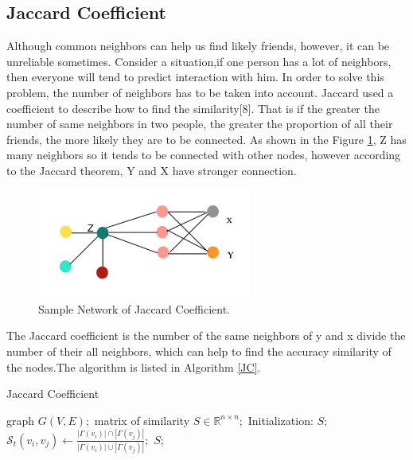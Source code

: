 \documentclass{article}
\begin{document}
\subsection{Jaccard Coefficient}
Although common neighbors can help us find likely friends, however, it can be unreliable sometimes. Consider a situation,if one person has a lot of neighbors, then everyone will tend to predict interaction with him. In order to solve this problem, the number of neighbors has to be taken into account. Jaccard used a coefficient to describe how to find the similarity[8]. That is if the greater the number of same neighbors in two people, the greater the proportion of all their friends, the more likely they are to be connected. As shown in the Figure \ref{JC_NW}, Z has many neighbors so it tends to be connected with other nodes, however according to the Jaccard theorem, Y and X have stronger connection. \\

\begin{figure}[h!]
	\includegraphics[width=7cm]{images/jc_nw.png}
	\centering
	\caption{Sample Network of Jaccard Coefficient.}	\label{JC_NW}
\end{figure}

The Jaccard coefficient is the number of the same neighbors of y and x divide the number of their all neighbors, which can help to find the accuracy similarity of the nodes.The algorithm is listed in Algorithm \ref{JC}. \\

\begin{algorithm}[htb] 
	\caption{Jaccard Coefficient} 
	\label{JC} 
	\begin{algorithmic}
		\REQUIRE  	graph $G(V,E);$
		\ENSURE  matrix of similarity $S \in \mathbb{R}^{n \times n};$
		\STATE Initialization: $S;$ 
		\STATE$\mathcal{S}_t(v_i,v_j) \gets  \frac{| \Gamma(v_i) |  \cap  | \Gamma(v_j) |}{ | \Gamma(v_i) |  \cup  | \Gamma(v_j) |};$
		\ENDFOR
		\ENDFOR
		\RETURN $S;$
	\end{algorithmic}
\end{algorithm}
\end{document}
